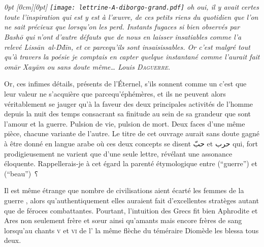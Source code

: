 
\section*{}
\thispagestyle{empty}
{
  \em\small
  0pt \textwidth
  0pt                \textwidth
  \noindent{}\raisebox{-\height+0.565cm}[0cm][0pt]{
    \hspace{-1.7cm}\texttt{[image: lettrine-A-diborgo-grand.pdf]}%
  }%
  oh oui, il y avait certes toute l’inspiration qui est y est à l’œuvre, de ces petits riens du quotidien que l’on ne sait précieux que lorsqu’on les perd. Instants fugaces si bien observés par Bashō qui n’ont d’autre défauts que de nous en laisser insatiables comme l’a relevé Lissān~al-Ḋḋīn, et ce parcequ’ils sont insaisissables. Or c’est malgré tout  qu’à travers la poésie je comptais en capter quelque instantané comme l’aurait fait omār Xayām ou sans doute même… Louis \textsc{Daguerre}.

  Or, ces infimes détails, présents de l’Éternel, s’ils sonnent comme un  c’est  que leur valeur ne s’acquière que parcequ’éphémères, et ils ne peuvent alors véritablement se jauger qu’à la faveur des deux principales activités de l’homme depuis la nuit des temps consacrant sa finitude au sein de sa grandeur que sont l’amour et la guerre. Pulsion de vie, pulsion de mort. Deux faces d’une même pièce, chacune variante de l’autre. Le titre de cet ouvrage aurait sans doute gagné à être donné en langue arabe où ces deux concepts se disent  \textarabic{حبّ} et  \textarabic{حرب} qui, fort prodigieusement ne varient que d’une seule lettre, révélant une assonance éloquente. Rappellerais-je à cet égard la parenté étymologique entre  (\enquote{guerre}) et  (\enquote{beau}) ⸮

   Il est même étrange que nombre de civilisations aient écarté les femmes de la guerre , alors qu’authentiquement elles auraient fait d’excellentes stratèges autant que de féroces combattantes. Pourtant, l’intuition des Grecs fit bien Aphrodite et Ares non seulement frère et sœur ainsi qu’amants mais encore frères de sang lorsqu’au chants \textsc{v} et \textsc{vi} de l’ la même flèche du téméraire Diomède les blessa tous deux.

}
